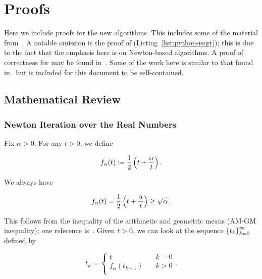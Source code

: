 \section{Proofs}
\label{app:proofs}

Here we include proofs for the new algorithms.
This includes some of the material from~\cite[Appendix B]{EfficientIsqrt}.
A notable omission is the proof of
\python{} (Listing~\ref{list:python-isqrt});
this is due to the fact that the emphasis here is on
Newton-based algorithms.
A proof of correctness for \python{}
may be found in~\cite[Appendix C]{EfficientIsqrt}.
Some of the work here is similar to that found
in~\cite[Appendix A]{EfficientIsqrt}
but is included for this document to be self-contained.


\subsection{Mathematical Review}

\subsubsection{Newton Iteration over the Real Numbers}

Fix $\alpha>0$.
For any $t>0$, we define

\begin{equation}
    f_{\alpha}(t) \coloneqq{} \frac{1}{2}\left( t + \frac{\alpha}{t} \right).
\end{equation}

\noindent
We always have

\begin{equation}
    f_{\alpha}(t) = \frac{1}{2}\parens{t + \frac{\alpha}{t}} \ge \sqrt{\alpha}.
\end{equation}

\noindent
This follows from the inequality of the arithmetic and geometric means
(AM-GM inequality); one reference is~\cite[Page 20]{CSMaster}.
Given $t>0$, we can look at the sequence $\left\{ t_{k} \right\}_{k=0}^{\infty}$
defined by

\begin{equation}
    t_{k} = \begin{cases}
        t \quad &k=0 \\
        f_{\alpha}(t_{k-1}) \quad &k>0 \\
    \end{cases}.
    \label{eq:app:proof:newton_seq}
\end{equation}

